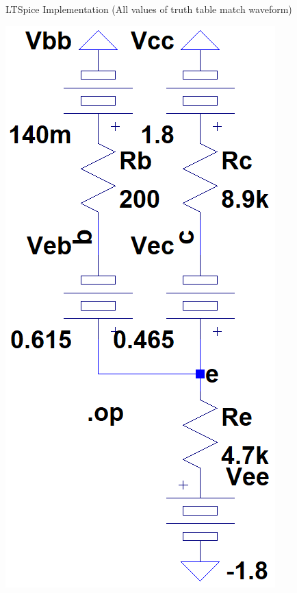 \documentclass[12pt,letterpaper,titlepage]{article}
\begin{document}
\begin{raggedright}
\begin{center}
LTSpice Implementation (All values of truth table match waveform)
\begin{paracol}{2}
\includegraphics[width=\textwidth, height=25\baselineskip, keepaspectratio=true]{ds2b}

\end{paracol}
\end{center}
\end{raggedright}
\end{document}
